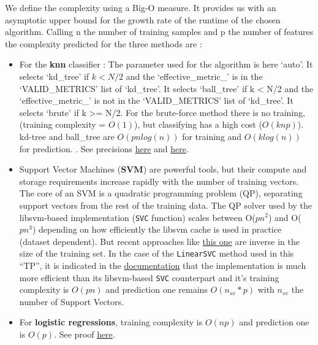 \documentclass[10pt,a4paper]{article}
\theoremstyle{break}
\begin{document}
We define the complexity using a Big-O measure. It provides us with an asymptotic upper bound for the growth rate of the runtime of the chosen algorithm. Calling n the number of training samples and p the number of features the complexity predicted for the three methods are :

\begin{itemize}
\item
  For the \textbf{knn} classifier : The parameter used for the algorithm is here `auto'. It selects `kd\_tree' if \(k < N/2\) and the `effective\_metric\_' is in the `VALID\_METRICS' list of `kd\_tree'. It selects `ball\_tree' if k \textless{} N/2 and the `effective\_metric\_' is not in the `VALID\_METRICS' list of `kd\_tree'. It selects `brute' if k \textgreater{}= N/2. For the brute-force method there is no training, (training complexity = \(O(1)\)), but classifying has a high cost (\(O(knp)\)). kd-tree and ball\_tree are \(O(pnlog(n))\) for training and \(O(klog(n))\) for prediction.
  . See precisions \href{https://towardsdatascience.com/k-nearest-neighbors-computational-complexity-502d2c440d5}{here} and \href{https://scikit-learn.org/stable/modules/generated/sklearn.neighbors.KNeighborsClassifier.html}{here}.
\item
  Support Vector Machines (\textbf{SVM}) are powerful tools, but their compute and storage requirements increase rapidly with the number of training vectors. The core of an SVM is a quadratic programming problem (QP), separating support vectors from the rest of the training data. The QP solver used by the libsvm-based implementation (\texttt{SVC} function) scales between O(\(pn^2\)) and O(\(pn^3\)) depending on how efficiently the libsvm cache is used in practice (dataset dependent). But recent approaches like \href{https://www.cs.huji.ac.il/~shais/papers/SSSICML08.pdf}{this one} are inverse in the size of the training set. In the case of the \texttt{LinearSVC} method used in this ``TP'', it is indicated in the \href{https://scikit-learn.org/stable/modules/svm.html\#complexity}{documentation} that the implementation is much more efficient than its libsvm-based \texttt{SVC} counterpart and it's training complexity is \(O(pn)\) and prediction one remains \(O(n_{sv}*p)\) with \(n_{sv}\) the number of Support Vectors.
\item
  For \textbf{logistic regressions}, training complexity is \(O(np)\) and prediction one is \(O(p)\). See proof \href{https://levelup.gitconnected.com/train-test-complexity-and-space-complexity-of-logistic-regression-2cb3de762054}{here}.
\end{itemize}
\end{document}
